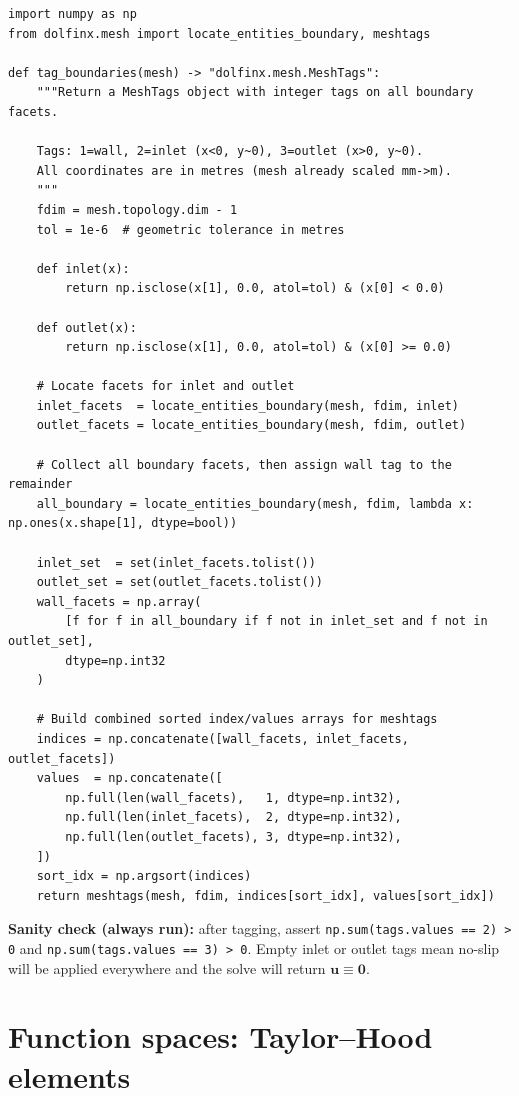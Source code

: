 \documentclass[11pt]{article}
\begin{document}
\begin{lstlisting}
import numpy as np
from dolfinx.mesh import locate_entities_boundary, meshtags

def tag_boundaries(mesh) -> "dolfinx.mesh.MeshTags":
    """Return a MeshTags object with integer tags on all boundary facets.

    Tags: 1=wall, 2=inlet (x<0, y~0), 3=outlet (x>0, y~0).
    All coordinates are in metres (mesh already scaled mm->m).
    """
    fdim = mesh.topology.dim - 1
    tol = 1e-6  # geometric tolerance in metres

    def inlet(x):
        return np.isclose(x[1], 0.0, atol=tol) & (x[0] < 0.0)

    def outlet(x):
        return np.isclose(x[1], 0.0, atol=tol) & (x[0] >= 0.0)

    # Locate facets for inlet and outlet
    inlet_facets  = locate_entities_boundary(mesh, fdim, inlet)
    outlet_facets = locate_entities_boundary(mesh, fdim, outlet)

    # Collect all boundary facets, then assign wall tag to the remainder
    all_boundary = locate_entities_boundary(mesh, fdim, lambda x: np.ones(x.shape[1], dtype=bool))

    inlet_set  = set(inlet_facets.tolist())
    outlet_set = set(outlet_facets.tolist())
    wall_facets = np.array(
        [f for f in all_boundary if f not in inlet_set and f not in outlet_set],
        dtype=np.int32
    )

    # Build combined sorted index/values arrays for meshtags
    indices = np.concatenate([wall_facets, inlet_facets, outlet_facets])
    values  = np.concatenate([
        np.full(len(wall_facets),   1, dtype=np.int32),
        np.full(len(inlet_facets),  2, dtype=np.int32),
        np.full(len(outlet_facets), 3, dtype=np.int32),
    ])
    sort_idx = np.argsort(indices)
    return meshtags(mesh, fdim, indices[sort_idx], values[sort_idx])
\end{lstlisting}

\textbf{Sanity check (always run):} after tagging, assert
\texttt{np.sum(tags.values == 2) > 0} and
\texttt{np.sum(tags.values == 3) > 0}. Empty inlet or outlet tags mean
no-slip will be applied everywhere and the solve will return
$\mathbf{u} \equiv \mathbf{0}$.

\section{Function spaces: Taylor--Hood elements}
\end{document}
